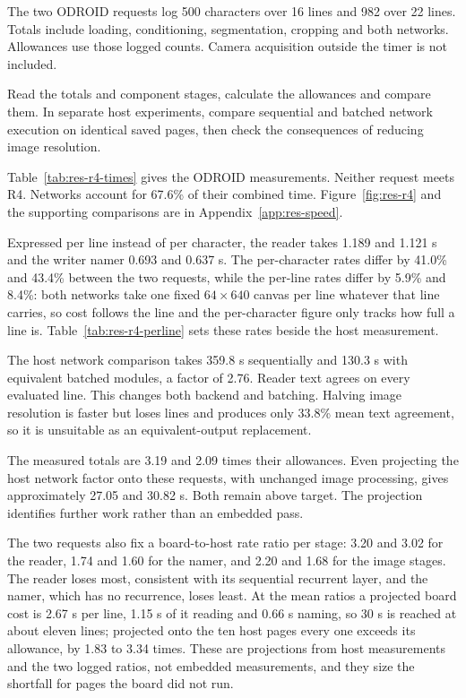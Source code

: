 The two ODROID requests log 500 characters over 16 lines and 982 over 22 lines. Totals include loading, conditioning, segmentation, cropping and both networks. Allowances use those logged counts. Camera acquisition outside the timer is not included.

Read the totals and component stages, calculate the allowances and compare them. In separate host experiments, compare sequential and batched network execution on identical saved pages, then check the consequences of reducing image resolution.

Table~\ref{tab:res-r4-times} gives the ODROID measurements. Neither request meets R4. Networks account for 67.6\% of their combined time. Figure~\ref{fig:res-r4} and the supporting comparisons are in Appendix~\ref{app:res-speed}.

Expressed per line instead of per character, the reader takes 1.189 and 1.121 s and the writer namer 0.693 and 0.637 s. The per-character rates differ by 41.0\% and 43.4\% between the two requests, while the per-line rates differ by 5.9\% and 8.4\%: both networks take one fixed $64\times640$ canvas per line whatever that line carries, so cost follows the line and the per-character figure only tracks how full a line is. Table~\ref{tab:res-r4-perline} sets these rates beside the host measurement.

The host network comparison takes 359.8 s sequentially and 130.3 s with equivalent batched modules, a factor of 2.76. Reader text agrees on every evaluated line. This changes both backend and batching. Halving image resolution is faster but loses lines and produces only 33.8\% mean text agreement, so it is unsuitable as an equivalent-output replacement.

The measured totals are 3.19 and 2.09 times their allowances. Even projecting the host network factor onto these requests, with unchanged image processing, gives approximately 27.05 and 30.82 s. Both remain above target. The projection identifies further work rather than an embedded pass.

The two requests also fix a board-to-host rate ratio per stage: 3.20 and 3.02 for the reader, 1.74 and 1.60 for the namer, and 2.20 and 1.68 for the image stages. The reader loses most, consistent with its sequential recurrent layer, and the namer, which has no recurrence, loses least. At the mean ratios a projected board cost is 2.67 s per line, 1.15 s of it reading and 0.66 s naming, so 30 s is reached at about eleven lines; projected onto the ten host pages every one exceeds its allowance, by 1.83 to 3.34 times. These are projections from host measurements and the two logged ratios, not embedded measurements, and they size the shortfall for pages the board did not run.

